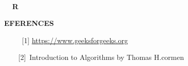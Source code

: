 \documentclass[10pt]{report}
\begin{document}
\begin{multicols}{2}
\textbf{ }\par


\vspace{\baselineskip}
\textbf{\ \ \ \ \ \ \ \ \ \ \  \ \ \ \ \ \ \  }\par

\textbf{\ \  R}{\fontsize{8pt}{9.6pt}\selectfont \textbf{EFERENCES\ \ \  }\par}\par


\vspace{\baselineskip}
{\fontsize{9pt}{10.8pt}\selectfont \ \ \ \ \ [1]  \href{https://www.geeksforgeeks.org}{https://www.geeksforgeeks.org}\par}\par


\vspace{\baselineskip}
{\fontsize{9pt}{10.8pt}\selectfont \ \ \ \  [2]\  Introduction to Algorithms by Thomas H.cormen\par}\par

{\fontsize{9pt}{10.8pt}\selectfont \  \par}\par


\end{multicols}
\printbibliography
\end{document}
